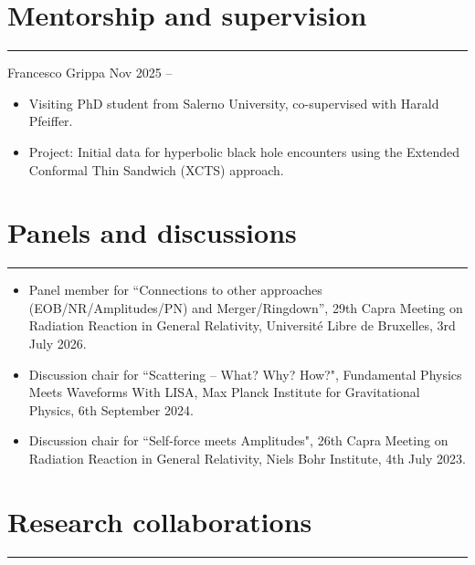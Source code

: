 \documentclass[10.5pt, oneside]{article}   	%
\begin{document}
 {\color{Sectioncolour}
\section*{Mentorship and supervision}
\vspace{-3mm}
\noindent\rule{\linewidth}{0.6pt}}

Francesco Grippa \hfill Nov 2025 -- \\ \vspace{-5mm}
\begin{itemize}
\item Visiting PhD student from Salerno University, co-supervised with Harald Pfeiffer.
\item Project: Initial data for hyperbolic black hole encounters using the Extended Conformal Thin Sandwich (XCTS) approach.
\end{itemize} 

 {\color{Sectioncolour}
\section*{Panels and discussions}
\vspace{-3mm}
\noindent\rule{\linewidth}{0.6pt}}
\begin{itemize}
\item Panel member for ``Connections to other approaches (EOB/NR/Amplitudes/PN) and Merger/Ringdown'', 29th Capra Meeting on Radiation Reaction in General Relativity, Université Libre de Bruxelles, 3rd July 2026.
\item Discussion chair for ``Scattering -- What? Why? How?", Fundamental Physics Meets Waveforms With LISA, Max Planck Institute for Gravitational Physics, 6th September 2024.
\item Discussion chair for ``Self-force meets Amplitudes", 26th Capra Meeting on Radiation Reaction in General Relativity, Niels Bohr Institute, 4th July 2023.
\end{itemize} 

{\color{Sectioncolour}
\section*{Research collaborations}
\vspace{-3mm}
\noindent\rule{\linewidth}{0.6pt}}
\end{document}
